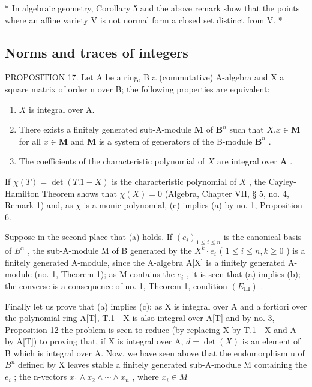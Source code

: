 * In algebraic geometry, Corollary 5 and the above remark show that the points where an affine variety V is not normal form a closed set distinct from V. *

\subsection{Norms and traces of integers}

PROPOSITION 17. Let A be a ring, B a (commutative) A-algebra and X a square matrix of order n over B; the following properties are equivalent:

\begin{enumerate}
\def\labelenumi{(\alph{enumi})}
\item
  \(X\) is integral over A.
\item
  There exists a finitely generated sub-A-module \(\mathbf{M}\) of \(\mathbf{B}^n\) such that \(X.x\in \mathbf{M}\) for all \(x\in \mathbf{M}\) and \(\mathbf{M}\) is a system of generators of the B-module \(\mathbf{B}^n\) .
\item
  The coefficients of the characteristic polynomial of \(X\) are integral over \(\mathbf{A}\) .
\end{enumerate}

  If \(\chi(T) = \det(T.1 - X)\) is the characteristic polynomial of \(X\) , the Cayley-Hamilton Theorem shows that \(\chi(X) = 0\) (Algebra, Chapter VII, § 5, no. 4, Remark 1) and, as \(\chi\) is a monic polynomial, (c) implies (a) by no. 1, Proposition 6.

  Suppose in the second place that (a) holds. If \((e_i)_{1 \leqslant i \leqslant n}\) is the canonical basis of \(B^n\) , the sub-A-module M of B generated by the \(X^k \cdot e_i\) ( \(1 \leqslant i \leqslant n, k \geqslant 0\) ) is a finitely generated A-module, since the A-algebra A[X] is a finitely generated A-module (no. 1, Theorem 1); as M contains the \(e_i\) , it is seen that (a) implies (b); the converse is a consequence of no. 1, Theorem 1, condition \((E_{\mathrm{III}})\) .

  Finally let us prove that (a) implies (c); as X is integral over A and a fortiori over the polynomial ring A[T], T.1 - X is also integral over A[T] and by no. 3, Proposition 12 the problem is seen to reduce (by replacing X by T.1 - X and A by A[T]) to proving that, if X is integral over A, \(d = \det(X)\) is an element of B which is integral over A. Now, we have seen above that the endomorphism u of \(B^{n}\) defined by X leaves stable a finitely generated sub-A-module M containing the \(e_{i}\) ; the n-vectors \(x_{1} \wedge x_{2} \wedge \cdots \wedge x_{n}\) , where \(x_{i} \in M\)

